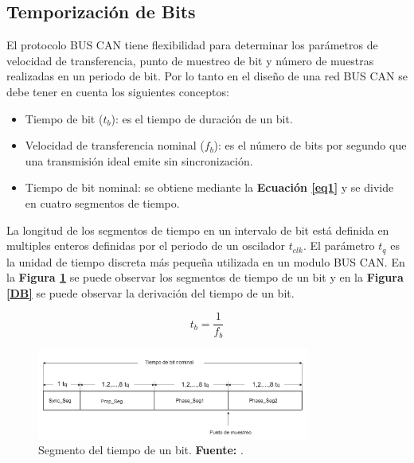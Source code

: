 \subsection{Temporización de Bits}

 El protocolo BUS CAN tiene flexibilidad para determinar los parámetros de velocidad de transferencia, punto de muestreo de bit y número de muestras realizadas en un periodo de bit. Por lo tanto en el diseño de una red BUS CAN se debe tener en cuenta los siguientes conceptos:

\begin{itemize}

\item Tiempo de bit ($t_b$): es el tiempo de duración de un bit.
\item Velocidad de transferencia nominal ($f_b$): es el número de bits por segundo que una transmisión ideal emite sin sincronización.
\item Tiempo de bit nominal: se obtiene mediante la \textbf{Ecuación \ref{eq1}} y se divide en cuatro segmentos de tiempo.

\end{itemize}

La longitud de los segmentos de tiempo en un intervalo de bit está definida en multiples enteros definidas por el periodo de un  oscilador $t_{clk}$. El parámetro $t_q$ es la unidad de tiempo discreta más pequeña utilizada en un modulo BUS CAN. En la \textbf{Figura \ref{TB}} se puede observar los segmentos de tiempo de un bit y en la \textbf{Figura \ref{DB}} se puede observar la derivación del tiempo de un bit.

\begin {equation}
\label {eq1}
t_b = \frac {1}{f_b}
\end {equation}

\begin{figure}[H]
	\centering
		\includegraphics[width=0.8\textwidth]{./Cap2imagen/tiempo_bit.pdf}
	\caption[Segmento del tiempo de un bit.]{Segmento del tiempo de un bit.\textbf{ Fuente:} \cite{DSEEPC}.}
	\label{TB} %
\end{figure}

